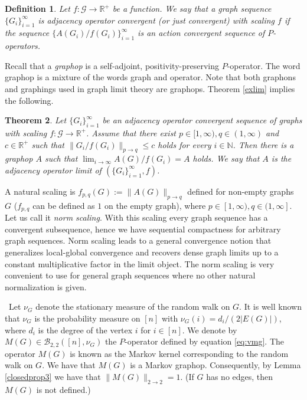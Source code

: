 \documentclass[a4wider]{amsart}
\newtheorem{theorem}{Theorem}[section]
\newtheorem{definition}[theorem]{Definition}
\theoremstyle{definitionbreak}\newtheorem{D}[theorem]{Definition}
\theoremstyle{definitionbreak}\newtheorem*{D*}{Definition}
\begin{document}
\begin{definition} Let $f:\mathcal{G}\to\mathbb{R}^+$ be a function. We say that a graph sequence $\{G_i\}_{i=1}^\infty$ is adjacency operator convergent (or just convergent) with scaling $f$ if the sequence $\{A(G_i)/f(G_i)\}_{i=1}^\infty$ is an action convergent sequence of $P$-operators. 
\end{definition}

Recall that a {\it graphop} is a self-adjoint, positivity-preserving $P$-operator. The word graphop is a mixture of the words graph and operator. Note that both graphons and graphings used in graph limit theory are graphops. Theorem \ref{exlim} implies the following.

\begin{theorem} Let $\{G_i\}_{i=1}^\infty$ be an adjacency operator convergent sequence of graphs with scaling $f:\mathcal{G}\to\mathbb{R}^+$. Assume that there exist $p\in [1,\infty),q\in (1,\infty)$ and $c\in\mathbb{R}^+$ such that $\|G_i/f(G_i)\|_{p\to q}\leq c$ holds for every $i\in\mathbb{N}$. Then there is a graphop $A$ such that $\lim_{i\to\infty} A(G)/f(G_i)=A$ holds. We say that $A$ is the adjacency operator limit of $(\{G_i\}_{i=1}^\infty,f)$.
\end{theorem}

A natural scaling  is $f_{p,q}(G):=\|A(G)\|_{p\to q}$ defined for non-empty graphs $G$ ($f_{p,q}$ can be defined as $1$ on the empty graph), where $p\in [1,\infty),q\in (1,\infty]$. Let us call it {\it norm scaling}. With this scaling every graph sequence has a convergent subsequence, hence we have sequential compactness for arbitrary graph sequences. Norm scaling leads to a general convergence notion that generalizes local-global convergence and recovers dense graph limits up to a constant multiplicative factor in the limit object. The norm scaling is very convenient to use for general graph sequences where no other natural normalization is given. 


\medskip

~Let $\nu_G$ denote the stationary measure of the random walk on $G$. It is well known that  $\nu_G$ is the probability measure on $[n]$ with $\nu_G(i)=d_i/(2|E(G)|)$,  where $d_i$ is the degree of the vertex $i$ for $i\in [n]$. We denote by $M(G)\in\mathcal{B}_{2,2}([n],\nu_G)$ the $P$-operator defined by equation \eqref{eq:vmg}. The operator $M(G)$ is known as the Markov kernel corresponding to the random walk on $G$. We have that $M(G)$ is a Markov graphop. Consequently, by Lemma \ref{closedprop3} we have that $\|M(G)\|_{2\rightarrow 2}=1$. (If $G$ has no edges, then $M(G)$ is not defined.)
\end{document}
